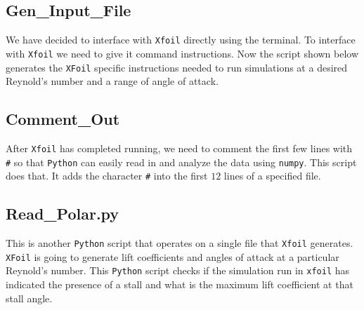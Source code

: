 \subsection{Gen\_Input\_File}

We have decided to interface with \texttt{Xfoil} directly using the terminal. To interface with \texttt{Xfoil} we need to give it command instructions. Now the script shown below generates the \texttt{XFoil} specific instructions needed to run simulations at a desired Reynold's number and a range of angle of attack.


\subsection{Comment\_Out}

After \texttt{Xfoil} has completed running, we need to comment the first few lines with \texttt{\#} so that \texttt{Python} can easily read in and analyze the data using \texttt{numpy}. This script does that. It adds the character \texttt{\#} into the first $12$ lines of a specified file.


\subsection{Read\_Polar.py}

This is another \texttt{Python} script that operates on a single file that \texttt{Xfoil} generates. \texttt{XFoil} is going to generate lift coefficients and angles of attack at a particular Reynold's number. This \texttt{Python} script checks if the simulation run in \texttt{xfoil} has indicated the presence of a stall and what is the maximum lift coefficient at that stall angle.


